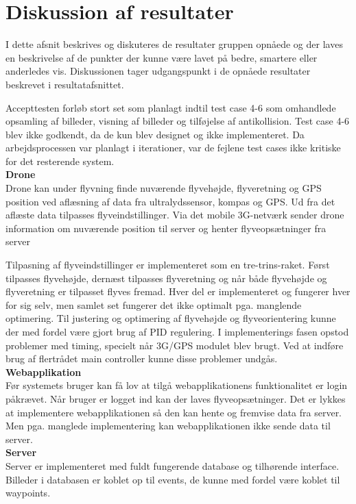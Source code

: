 \section{Diskussion af resultater}

I dette afsnit beskrives og diskuteres de resultater gruppen opnåede og der laves en beskrivelse af de punkter der kunne være lavet på bedre, smartere eller anderledes vis. Diskussionen tager udgangspunkt i de opnåede resultater beskrevet i resultatafsnittet.

Accepttesten forløb stort set som planlagt indtil test case 4-6 som omhandlede opsamling af billeder, visning af billeder og tilføjelse af antikollision. Test case 4-6 blev ikke godkendt, da de kun blev designet og ikke implementeret. Da arbejdsprocessen var planlagt i iterationer, var de fejlene test cases ikke kritiske for det resterende system.\\

\textbf{Drone}\\
Drone kan under flyvning finde nuværende flyvehøjde, flyveretning og GPS position ved aflæsning af data fra ultralydssensor, kompas og GPS.  Ud fra det aflæste data tilpasses flyveindstillinger. Via det mobile 3G-netværk sender drone information om nuværende position til server og henter flyveopsætninger fra server

Tilpasning af flyveindstillinger er implementeret som en tre-trins-raket. Først tilpasses flyvehøjde, dernæst tilpasses flyveretning og når både flyvehøjde og flyveretning er tilpasset flyves fremad. Hver del er implementeret og fungerer hver for sig selv, men samlet set fungerer det ikke optimalt pga. manglende optimering. Til justering og optimering af flyvehøjde og flyveorientering kunne der med fordel være gjort brug af PID regulering.  I implementerings fasen opstod problemer med timing, specielt når 3G/GPS modulet blev brugt. Ved at indføre brug af flertrådet main controller kunne disse problemer undgås. \\

\textbf{Webapplikation}\\
Før systemets bruger kan få lov at tilgå webapplikationens funktionalitet er login påkrævet. Når bruger er logget ind kan der laves flyveopsætninger. Det er lykkes at implementere webapplikationen så den kan hente og fremvise data fra server. 
Men pga. manglede implementering kan webapplikationen ikke sende data til server.\\


\textbf{Server}\\
Server er implementeret med fuldt fungerende database og tilhørende interface. Billeder i databasen er koblet op til events, de kunne med fordel være koblet til waypoints.

